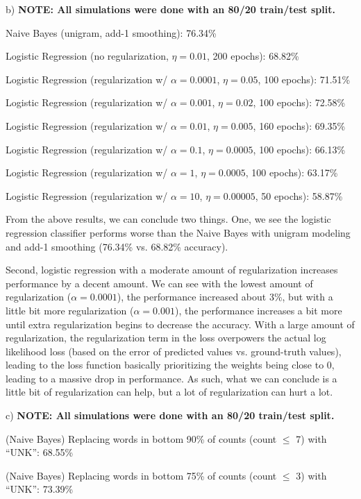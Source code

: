 \begin{solution}
b) \textbf{NOTE: All simulations were done with an 80/20 train/test split.}

Naive Bayes (unigram, add-1 smoothing): 76.34\%

Logistic Regression (no regularization, $\eta = 0.01$, 200 epochs): 68.82\%

Logistic Regression (regularization w/ $\alpha = 0.0001$, $\eta = 0.05$, 100 epochs): 71.51\%

Logistic Regression (regularization w/ $\alpha = 0.001$, $\eta = 0.02$, 100 epochs): 72.58\%

Logistic Regression (regularization w/ $\alpha = 0.01$, $\eta = 0.005$, 160 epochs): 69.35\%

Logistic Regression (regularization w/ $\alpha = 0.1$, $\eta = 0.0005$, 100 epochs): 66.13\%

Logistic Regression (regularization w/ $\alpha = 1$, $\eta = 0.0005$, 100 epochs): 63.17\%

Logistic Regression (regularization w/ $\alpha = 10$, $\eta = 0.00005$, 50 epochs): 58.87\%

From the above results, we can conclude two things. One, we see the logistic regression classifier performs worse than the Naive Bayes with unigram modeling and add-1 smoothing (76.34\% vs. 68.82\% accuracy). 

Second, logistic regression with a moderate amount of regularization increases performance by a decent amount. We can see with the lowest amount of regularization ($\alpha = 0.0001$), the performance increased about 3\%, but with a little bit more regularization ($\alpha = 0.001$), the performance increases a bit more until extra regularization begins to decrease the accuracy. With a large amount of regularization, the regularization term in the loss overpowers the actual log likelihood loss (based on the error of predicted values vs. ground-truth values), leading to the loss function basically prioritizing the weights being close to 0, leading to a massive drop in performance. As such, what we can conclude is a little bit of regularization can help, but a lot of regularization can hurt a lot.

c) \textbf{NOTE: All simulations were done with an 80/20 train/test split.}

(Naive Bayes) Replacing words in bottom 90\% of counts (count $\leq$ 7) with ``UNK'': 68.55\%

(Naive Bayes) Replacing words in bottom 75\% of counts (count $\leq$ 3) with ``UNK'': 73.39\%


\end{solution}
